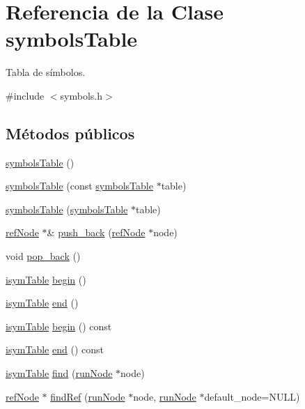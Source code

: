 \hypertarget{classsymbolsTable}{\section{Referencia de la Clase symbols\-Table}
\label{classsymbolsTable}
}


Tabla de símbolos.  




{\ttfamily \#include $<$symbols.\-h$>$}

\subsection*{Métodos públicos}
\begin{DoxyCompactItemize}
\item 
\hyperlink{classsymbolsTable_a9a6e7802e446e8902ea850c94f1a10bd}{symbols\-Table} ()
\item 
\hyperlink{classsymbolsTable_ae7753ebe94000f6440a9f13ce174846c}{symbols\-Table} (const \hyperlink{classsymbolsTable}{symbols\-Table} $\ast$table)
\item 
\hyperlink{classsymbolsTable_a1a1e095ea56925b2932a72caebf5f7b4}{symbols\-Table} (\hyperlink{classsymbolsTable}{symbols\-Table} $\ast$table)
\item 
\hyperlink{classrefNode}{ref\-Node} $\ast$\& \hyperlink{classsymbolsTable_a519d5bfed68a2d2d93c9dba7b4e877ff}{push\-\_\-back} (\hyperlink{classrefNode}{ref\-Node} $\ast$node)
\item 
void \hyperlink{classsymbolsTable_a12abb82234dadb898ab7e7beda487a27}{pop\-\_\-back} ()
\item 
\hyperlink{classisymTable}{isym\-Table} \hyperlink{classsymbolsTable_a268924344725d21450d31e0e7538b7b4}{begin} ()
\item 
\hyperlink{classisymTable}{isym\-Table} \hyperlink{classsymbolsTable_a00b865b64083f375f734ff5b6a9d6659}{end} ()
\item 
\hyperlink{classisymTable}{isym\-Table} \hyperlink{classsymbolsTable_a6d55b62ea700a80144f80cb41b3af474}{begin} () const 
\item 
\hyperlink{classisymTable}{isym\-Table} \hyperlink{classsymbolsTable_a6cfc5bdad1b1297371b7da0582c0fc39}{end} () const 
\item 
\hyperlink{classisymTable}{isym\-Table} \hyperlink{classsymbolsTable_ae90d26824150c4573dd53730187e742e}{find} (\hyperlink{classrunNode}{run\-Node} $\ast$node)
\item 
\hyperlink{classrefNode}{ref\-Node} $\ast$ \hyperlink{classsymbolsTable_a2018d3971bd0fb65878e8d378c519320}{find\-Ref} (\hyperlink{classrunNode}{run\-Node} $\ast$node, \hyperlink{classrunNode}{run\-Node} $\ast$default\-\_\-node=N\-U\-L\-L)

\end{DoxyCompactItemize}
